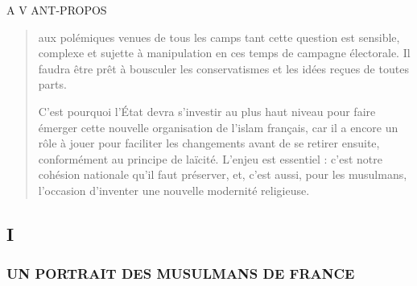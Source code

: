 A V ANT-PROPOS

\begin{quote}
aux polémiques venues de tous les camps tant cette question est
sensible, complexe et sujette à manipulation en ces temps de campagne
électorale. Il faudra être prêt à bousculer les conservatismes et les
idées reçues de toutes parts.

C'est pourquoi l'État devra s'investir au plus haut niveau pour faire
émerger cette nouvelle organisation de l'islam français, car il a encore
un rôle à jouer pour faciliter les changements avant de se retirer
ensuite, conformément au principe de laïcité. L'enjeu est essentiel :
c'est notre cohésion nationale qu'il faut préserver, et, c'est aussi,
pour les musulmans, l'occasion d'inventer une nouvelle modernité
religieuse.
\end{quote}

\hypertarget{i}{%
\subsection{I}\label{i}}

\hypertarget{un-portrait-des-musulmans-de-france}{%
\subsubsection{UN PORTRAIT DES MUSULMANS DE
FRANCE}\label{un-portrait-des-musulmans-de-france}}

